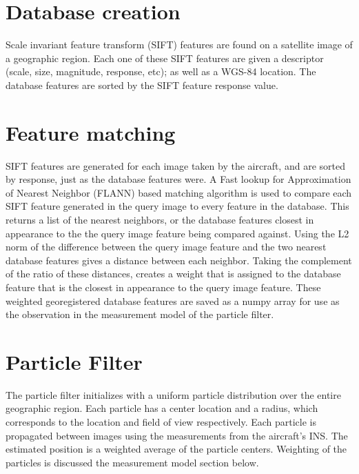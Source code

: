\documentclass[conference]{IEEEtran}
\begin{document}
\section{Database creation}
Scale invariant feature transform (SIFT) features are found on a satellite image of a geographic region. Each one of these SIFT features are given a descriptor (scale, size, magnitude, response, etc); as well as a WGS-84 location. The database features are sorted by the SIFT feature response value.

\section{Feature matching}
SIFT features are generated for each image taken by the aircraft, and are sorted by response, just as the database features were. A Fast lookup for Approximation of Nearest Neighbor (FLANN) based matching algorithm is used to compare each SIFT feature generated in the query image to every feature in the database. This returns a list of the nearest neighbors, or the database features closest in appearance to the the query image feature being compared against. Using the L2 norm of the difference between the query image feature and the two nearest database features gives a distance between each neighbor. Taking the complement of the ratio of these distances, creates a weight that is assigned to the database feature that is the closest in appearance to the query image feature. These weighted georegistered database features are saved as a numpy array for use as the observation in the measurement model of the particle filter.

\section{Particle Filter}
The particle filter initializes with a uniform particle distribution over the entire geographic region. Each particle has a center location and a radius, which corresponds to the location and field of view respectively. Each particle is propagated between images using the measurements from the aircraft's INS. The estimated position is a weighted average of the particle centers. Weighting of the particles is discussed the measurement model section below.
\end{document}
